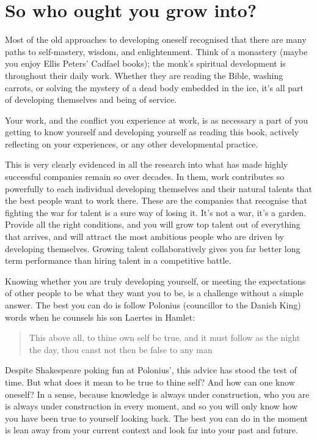 \section{So who ought you grow into?}
Most of the old approaches to developing oneself recognised that there are many paths to self-mastery, wisdom, and enlightenment. Think of a monastery (maybe you enjoy Ellis Peters’ Cadfael books); the monk’s spiritual development is throughout their daily work. Whether they are reading the Bible, washing carrots, or solving the mystery of a dead body embedded in the ice, it's all part of developing themselves and being of service.


Your work, and the conflict you experience at work, is as necessary a part of you getting to know yourself and developing yourself as reading this book, actively reflecting on your experiences, or any other developmental practice\cite{laske-vol1, sen-development}.


This is very clearly evidenced in all the research into what has made highly successful companies remain so over decades. In them, work contributes so powerfully to each individual developing themselves and their natural talents that the best people want to work there. These are the companies that recognise that fighting the war for talent is a sure way of losing it. It's not a war, it's a garden. Provide all the right conditions, and you will grow top talent out of everything that arrives, and will attract the most ambitious people who are driven by developing themselves. Growing talent collaboratively gives you far better long term performance than hiring talent in a competitive battle.


Knowing whether you are truly developing yourself, or meeting the expectations of other people to be what they want you to be, is a challenge without a simple answer. The best you can do is follow Polonius  (councillor to the Danish King) words when he counsels his son Laertes in Hamlet\cite{shakespeare-own-self}: \begin{quote}This above all, to thine own self be true, and it must follow as the night the day, thou canst not then be false to any man\end{quote} 


Despite Shakespeare poking fun at Polonius’, this advice has stood the test of time. But what does it mean to be true to thine self? And how can one know oneself? In a sense, because knowledge is always under construction, who you are is always under construction in every moment, and so you will only know how you have been true to yourself looking back. The best you can do in the moment is lean away from your current context and look far into your past and future.


